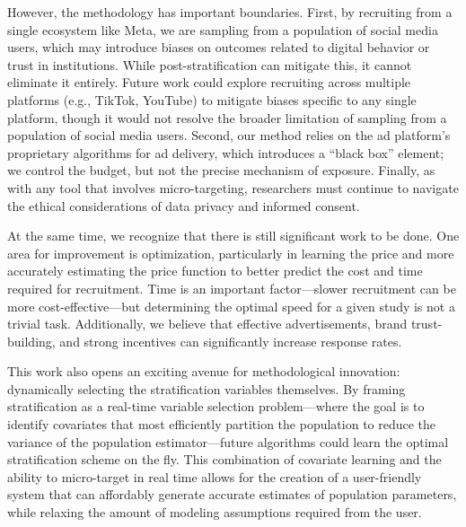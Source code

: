 However, the methodology has important boundaries. First, by recruiting from a single ecosystem like Meta, we are sampling from a population of social media users, which may introduce biases on outcomes related to digital behavior or trust in institutions. While post-stratification can mitigate this, it cannot eliminate it entirely. Future work could explore recruiting across multiple platforms (e.g., TikTok, YouTube) to mitigate biases specific to any single platform, though it would not resolve the broader limitation of sampling from a population of social media users. Second, our method relies on the ad platform's proprietary algorithms for ad delivery, which introduces a ``black box'' element; we control the budget, but not the precise mechanism of exposure. Finally, as with any tool that involves micro-targeting, researchers must continue to navigate the ethical considerations of data privacy and informed consent.

At the same time, we recognize that there is still significant work to be done. One area for improvement is optimization, particularly in learning the price and more accurately estimating the price function to better predict the cost and time required for recruitment. Time is an important factor—slower recruitment can be more cost-effective—but determining the optimal speed for a given study is not a trivial task. Additionally, we believe that effective advertisements, brand trust-building, and strong incentives can significantly increase response rates.

This work also opens an exciting avenue for methodological innovation: dynamically selecting the stratification variables themselves. By framing stratification as a real-time variable selection problem—where the goal is to identify covariates that most efficiently partition the population to reduce the variance of the population estimator—future algorithms could learn the optimal stratification scheme on the fly. This combination of covariate learning and the ability to micro-target in real time allows for the creation of a user-friendly system that can affordably generate accurate estimates of population parameters, while relaxing the amount of modeling assumptions required from the user. 




